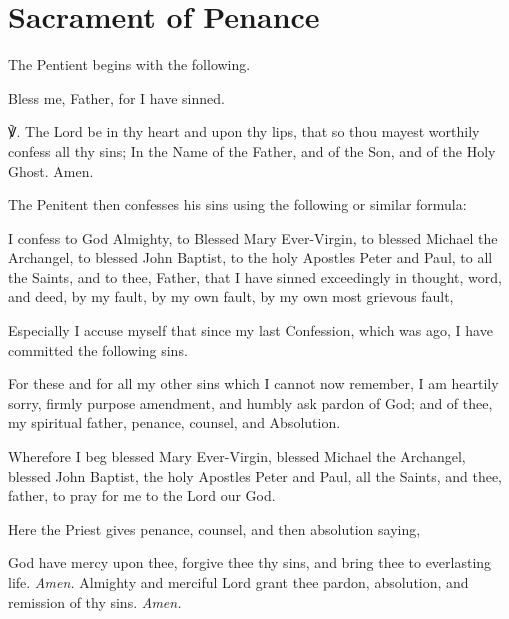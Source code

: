 \section{Sacrament of Penance}
\begin{multicols}{2}
\begin{rubric}
	The Pentient begins with the following.
\end{rubric}
Bless me, Father, for I have sinned.\par

℣. The Lord be in thy heart and upon thy lips, that so thou mayest worthily confess all thy sins; In the Name of the Father, {} and of the Son, and of the Holy Ghost. Amen.\par
\begin{rubric}
	{The Penitent then confesses his sins using the following or similar formula:}
\end{rubric}
\label{Confiteor}
I confess to God Almighty, to Blessed Mary Ever-Virgin, to blessed Michael the Archangel, to blessed John Baptist, to the holy Apostles Peter and Paul, to all the Saints, and to thee, Father, that I have sinned exceedingly in thought, word, and deed, by my fault, by my own fault, by my own most grievous fault,\par
Especially I accuse myself that since my last Confession, which was  ago, I have committed the following sins. \par
For these and for all my other sins which I cannot now remember, I am heartily sorry, firmly purpose amendment, and humbly ask pardon of God; and of thee, my spiritual father, penance, counsel, and Absolution.\par
Wherefore I beg blessed Mary Ever-Virgin, blessed Michael the Archangel, blessed John Baptist, the holy Apostles Peter and Paul, all the Saints, and thee, father, to pray for me to the Lord our God.
\begin{rubric}
	{Here the Priest gives penance, counsel, and then absolution saying,}
\end{rubric}
 God have mercy upon thee, forgive thee thy sins, and bring thee to everlasting life. \textit{Amen.}%
 Almighty and merciful Lord grant thee pardon, {} absolution, and remission of thy sins. \textit{Amen.}%

\end{multicols}
